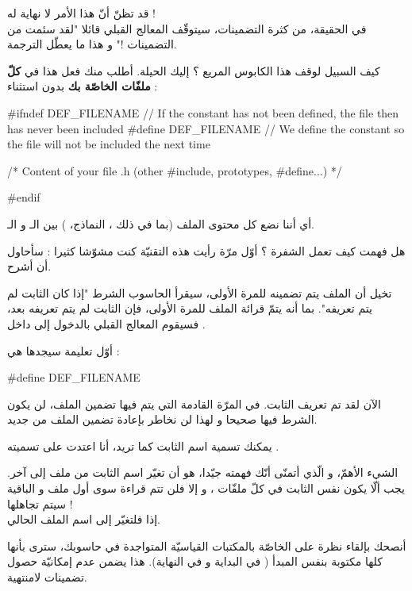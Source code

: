 قد تظنّ أنّ هذا الأمر لا نهاية له !\\
في الحقيقة، من كثرة التضمينات، سيتوقّف المعالج القبلي قائلا "لقد سئمت من التضمينات !" و هذا ما يعطّل الترجمة.

كيف السبيل لوقف هذا الكابوس المريع ؟ إليك الحيلة. أطلب منك فعل هذا في
\textbf{كلّ ملفّات
الخاصّة بك} بدون استثناء :

\begin{Csource}
#ifndef DEF_FILENAME // If the constant has not been defined, the file then has never been included
#define DEF_FILENAME // We define the constant so the file will not be included the next time

/* Content of your file .h (other #include, prototypes, #define...) */

#endif
\end{Csource}

أي أننا نضع كل محتوى الملف
(بما في ذلك
،
النماذج،
)
بين الـ
و الـ.

هل فهمت كيف تعمل الشفرة ؟ أوّل مرّة رأيت هذه التقنيّة كنت مشوّشا كثيرا : سأحاول أن أشرح.

تخيل أن الملف
يتم تضمينه للمرة الأولى، سيقرأ الحاسوب الشرط "إذا كان الثابت
لم يتم تعريفه". بما أنه يتمّ قرائة الملف للمرة الأولى، فإن الثابت لم يتم تعريفه بعد، فسيقوم المعالج القبلي بالدخول إلى داخل
.

أوّل تعليمة سيجدها هي :

\begin{Csource}
#define DEF_FILENAME
\end{Csource}

الآن لقد تم تعريف الثابت. في المرّة القادمة التي يتم فيها تضمين الملف، لن يكون الشرط فيها صحيحا و لهذا لن نخاطر بإعادة تضمين الملف من جديد.

يمكنك تسمية اسم الثابت كما تريد، أنا اعتدت على تسميته
.

الشيء الأهمّ، و الّذي أتمنّى أنّك فهمته جيّدا، هو أن تغيّر اسم الثابت من ملف
إلى آخر. يجب ألّا يكون نفس الثابت في كلّ ملفّات
،
و إلا فلن تتم قراءة سوى أول ملف
و الباقية سيتم تجاهلها !\\
إذا فلتغيّر
إلى اسم الملف الحالي.
\begin{information}
أنصحك بإلقاء نظرة على
الخاصّة بالمكتبات القياسيّة المتواجدة في حاسوبك، سترى بأنها
كلها
مكتوبة بنفس المبدأ
(
في البداية و
في النهاية). هذا يضمن عدم إمكانيّة حصول تضمينات لامنتهية.
\end{information}

